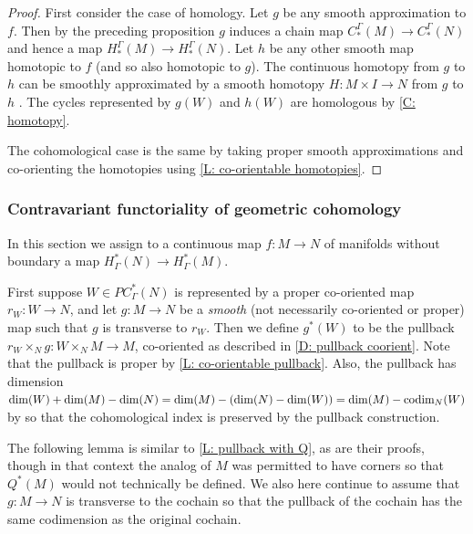 \begin{proof}
	First consider the case of homology.
	Let $g$ be any smooth approximation to $f$.
	Then by the preceding proposition $g$ induces a chain map $C_*^\Gamma(M) \to C_*^\Gamma(N)$ and hence a map $H_*^\Gamma(M) \to H_*^\Gamma(N)$.
	Let $h$ be any other smooth map homotopic to $f$ (and so also homotopic to $g$).
	The continuous homotopy from $g$ to $h$ can be smoothly approximated by a smooth homotopy $H \colon M \times I \to N$ from $g$ to $h$ \cite[Theorem III.2.5]{Kos93}.
	The cycles represented by $g(W)$ and $h(W)$ are homologous by \cref{C: homotopy}.

	The cohomological case is the same by taking proper smooth approximations and co-orienting the homotopies using \cref{L: co-orientable homotopies}.
\end{proof}

\subsubsection{Contravariant functoriality of geometric cohomology}\label{S: cohomology pullback}

In this section we assign to a continuous map $f \colon M \to N$ of manifolds without boundary a map $H^*_\Gamma(N) \to H^*_\Gamma(M)$.

First suppose $W \in PC^*_\Gamma(N)$ is represented by a proper co-oriented map $r_W \colon W \to N$, and let
$g \colon M \to N$ be a \textit{smooth} (not necessarily co-oriented or proper) map such that $g$ is transverse to $r_W$.
Then we define $g^*(W)$ to be the pullback $r_W \times_N g \colon W \times_N M \to M$, co-oriented as described in \cref{D: pullback coorient}.
Note that the pullback is proper by \cref{L: co-orientable pullback}.
Also, the pullback has dimension $\dim(W)+\dim(M)-\dim(N) = \dim(M)-(\dim(N)-\dim(W)) = \dim(M)-\text{codim}_N(W)$ by \cite[Theorem 6.4]{Joy12} so that the cohomological index is preserved by the pullback construction.

The following lemma is similar to \cref{L: pullback with Q}, as are their proofs, though in that context the analog of $M$ was permitted to have corners so that $Q^*(M)$ would not technically be defined.
We also here continue to assume that $g \colon M \to N$ is transverse to the cochain so that the pullback of the cochain has the same codimension as the original cochain.

